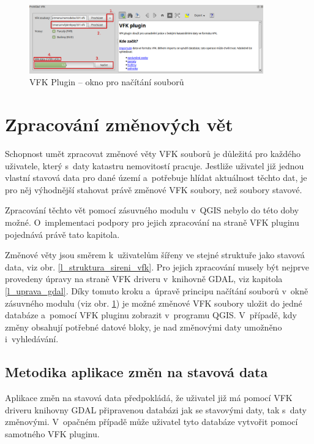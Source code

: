 \documentclass[a4paper,12pt,oneside]{book}
\begin{document}
\begin{figure}[htb]
\centering
\includegraphics[width=0.9\textwidth]{images/vfkPlugin-novy_vzhled.png}
\caption[VFK Plugin -- okno pro načítání souborů]{VFK Plugin -- okno pro načítání souborů}
\label{l_plugin_novy_vzhled}
\end{figure}


\newpage
\section{Zpracování změnových vět}
\label{l_zpracovani_zmen}
Schopnost umět zpracovat změnové věty VFK souborů je důležitá pro každého uživatele, který s~daty katastru nemovitostí pracuje. Jestliže uživatel již jednou vlastní stavová data pro dané území a~potřebuje hlídat aktuálnost těchto dat, je pro něj výhodnější stahovat právě změnové VFK soubory, než soubory stavové. 

Zpracování těchto vět pomocí zásuvného modulu v~QGIS nebylo do této doby možné. O~implementaci podpory pro jejich zpracování na straně VFK pluginu pojednává právě tato kapitola.

Změnové věty jsou směrem k~uživatelům šířeny ve stejné struktuře jako stavová data, viz obr. \ref{l_struktura_sireni_vfk}. Pro jejich zpracování musely být nejprve provedeny úpravy na straně VFK driveru v~knihovně GDAL, viz kapitola \ref{l_uprava_gdal}. Díky tomuto kroku a~úpravě principu načítání souborů v~okně zásuvného modulu (viz obr. \ref{l_plugin_novy_vzhled}) je možné změnové VFK soubory uložit do jedné databáze a~pomocí VFK pluginu zobrazit v~programu QGIS. V~případě, kdy změny obsahují potřebné datové bloky, je nad změnovými daty umožněno i~vyhledávání.

\subsection{Metodika aplikace změn na stavová data}
Aplikace změn na stavová data předpokládá, že uživatel již má pomocí VFK driveru knihovny GDAL připravenou databázi jak se stavovými daty, tak s~daty změnovými. V~opačném případě může uživatel tyto databáze vytvořit pomocí samotného VFK pluginu. 
\end{document}
